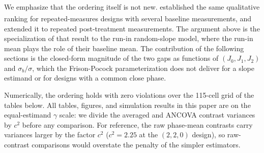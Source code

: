 \documentclass[
  11pt,
]{article}
\begin{document}
We emphasize that the ordering itself is not new.\textsuperscript{} established the same qualitative ranking for
repeated-measures designs with several baseline
measurements, and\textsuperscript{} extended it to repeated
post-treatment measurements. The argument above is the
specialization of that result to the run-in
random-slope model, where the run-in mean plays the
role of their baseline mean. The contribution of the
following sections is the closed-form magnitude of the
two gaps as functions of \((J_0, J_1, J_2)\) and
\(\sigma_b/\sigma\), which the Frison-Pocock
parameterization does not deliver for a slope estimand
or for designs with a common close phase.

Numerically, the ordering holds with zero violations
over the 115-cell grid of the tables below. All tables,
figures, and simulation results in this paper are on the
equal-estimand \(\gamma\) scale: we divide the averaged
and ANCOVA contrast variances by \(c^2\) before any
comparison. For reference, the raw phase-mean contrasts
carry variances larger by the factor \(c^2\) (\(c^2 = 2.25\)
at the \((2,2,0)\) design), so raw-contrast comparisons
would overstate the penalty of the simpler estimators.
\end{document}
